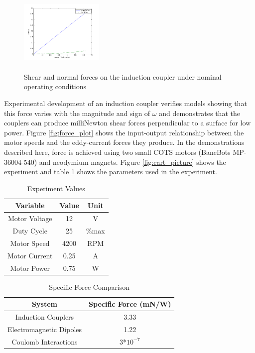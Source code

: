 \begin{figure}
\includegraphics[width = 4cm, height = 4cm ]{figures/tan_v_norm_force.png}

\caption{Shear and normal forces on the induction coupler under nominal operating conditions}
\label{fig:tan_v_norm_f}
\end{figure}

Experimental development of an induction coupler verifies models showing that this force varies with the magnitude and sign of $\omega$ and demonstrates that the couplers can produce milliNewton shear forces perpendicular to a surface for low power. Figure \ref{fig:force_plot} shows the input-output relationship between the motor speeds and the eddy-current forces they produce. In the demonstrations described here, force is achieved using two small COTS motors (BaneBots MP-36004-540) and neodymium magnets. Figure \ref{fig:cart_picture} shows the experiment  and table \ref{tab:exp_vals} shows the parameters used in the experiment.

\begin{table}
\caption{\label{tab:exp_vals} Experiment Values}
\begin{ruledtabular}
\begin{tabular}{ccc}
Variable & Value & Unit \\
\hline
 Motor Voltage & 12 & V\\
 Duty Cycle & 25 & \%max\\
 Motor Speed & 4200 & RPM \\
 Motor Current & 0.25 & A \\
 Motor Power & 0.75 & W \\
\end{tabular}
\end{ruledtabular}
\end{table}

\begin{table}
\caption{\label{tab:eforce_comparison} Specific Force Comparison}
\begin{ruledtabular}
\begin{tabular}{cc}
System & Specific Force (mN/W) \\
\hline
 Induction Couplers & 3.33 \\
 Electromagnetic Dipoles & 1.22 \cite{Kong2004} \\
 Coulomb Interactions & 3*$10^{-7}$ \cite{king2002spacecraft}\\
\end{tabular}
\end{ruledtabular}
\end{table}

